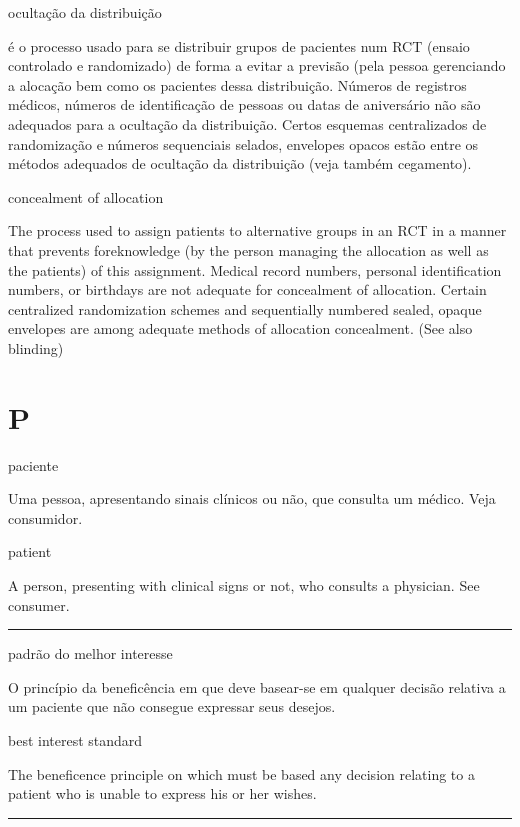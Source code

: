 \documentclass[
  openany]{book}
\begin{document}
ocultação da distribuição

é o processo usado para se distribuir grupos de pacientes num RCT (ensaio controlado e randomizado) de forma a evitar a previsão (pela pessoa gerenciando a alocação bem como os pacientes dessa distribuição. Números de registros médicos, números de identificação de pessoas ou datas de aniversário não são adequados para a ocultação da distribuição. Certos esquemas centralizados de randomização e números sequenciais selados, envelopes opacos estão entre os métodos adequados de ocultação da distribuição (veja também cegamento).

concealment of allocation

The process used to assign patients to alternative groups in an RCT in a manner that prevents foreknowledge (by the person managing the allocation as well as the patients) of this assignment. Medical record numbers, personal identification numbers, or birthdays are not adequate for concealment of allocation. Certain centralized randomization schemes and sequentially numbered sealed, opaque envelopes are among adequate methods of allocation concealment. (See also blinding)

\hypertarget{p}{%
\chapter*{P}\label{p}}

paciente

Uma pessoa, apresentando sinais clínicos ou não, que consulta um médico. Veja consumidor.

patient

A person, presenting with clinical signs or not, who consults a physician. See consumer.

\begin{center}\rule{0.5\linewidth}{0.5pt}\end{center}

padrão do melhor interesse

O princípio da beneficência em que deve basear-se em qualquer decisão relativa a um paciente que não consegue expressar seus desejos.

best interest standard

The beneficence principle on which must be based any decision relating to a patient who is unable to express his or her wishes.

\begin{center}\rule{0.5\linewidth}{0.5pt}\end{center}
\end{document}
